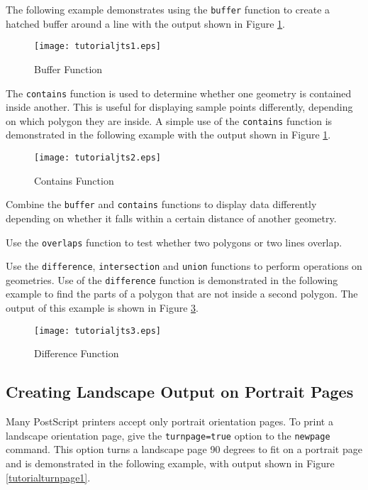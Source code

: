 The following example demonstrates using the \texttt{buffer} function to
create a hatched buffer around a line
with the output shown in Figure \ref{tutorialjts1}.



\begin{figure}[htb]
\texttt{[image: tutorialjts1.eps]}
\caption{Buffer Function}
\label{tutorialjts1}
\end{figure}

The \texttt{contains} function is used to determine whether one geometry
is contained inside another.  This is useful for displaying sample points
differently, depending on which polygon they are inside.
A simple use of the \texttt{contains} function is
demonstrated in the following example
with the output shown in Figure \ref{tutorialjts1}.



\begin{figure}[htb]
\texttt{[image: tutorialjts2.eps]}
\caption{Contains Function}
\label{tutorialjts2}
\end{figure}

Combine the \texttt{buffer} and \texttt{contains} functions to
display data differently depending on whether it falls within
a certain distance of another geometry.

Use the \texttt{overlaps} function to test whether two
polygons or two lines overlap.

Use the \texttt{difference}, \texttt{intersection} and \texttt{union}
functions to perform operations on geometries.
Use of the \texttt{difference} function is demonstrated in the
following example to find the parts of a polygon that are not inside a second
polygon.  The output of this example is shown in Figure \ref{tutorialjts3}.



\begin{figure}[htb]
\texttt{[image: tutorialjts3.eps]}
\caption{Difference Function}
\label{tutorialjts3}
\end{figure}

\subsection{Creating Landscape Output on Portrait Pages}

Many PostScript printers accept only portrait orientation pages.
To print a landscape orientation page, 
give the \texttt{turnpage=true} option to the \texttt{newpage} command.
This option turns a landscape page 90 degrees to fit on a portrait page
and is demonstrated in the following example,
with output shown in Figure \ref{tutorialturnpage1}.

